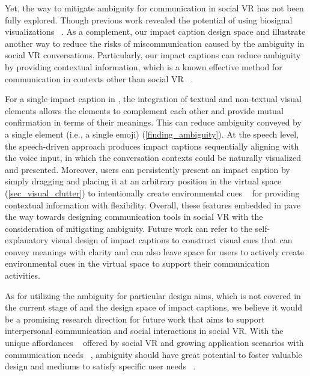 Yet, the way to mitigate ambiguity for communication in social VR has not been fully explored. Though previous work revealed the potential of using biosignal visualizations ~\cite{lee2022understanding}.
As a complement, our impact caption design space and \system{} illustrate another way to reduce the risks of miscommunication caused by the ambiguity in social VR conversations. Particularly, our impact captions can reduce ambiguity by providing contextual information, which is a known effective method for communication in contexts other than social VR ~\cite{cottone2009solving, dey2005designing, miller2017understanding}.

For a single impact caption in \system{}, the integration of textual and non-textual visual elements allows the elements to complement each other and provide mutual confirmation in terms of their meanings. This can reduce ambiguity conveyed by a single element (i.e., a single emoji) (\autoref{finding_ambiguity}). 
At the speech level, the speech-driven approach produces impact captions sequentially aligning with the voice input, in which the conversation contexts could be naturally visualized and presented. 
Moreover, users can persistently present an impact caption by simply dragging and placing it at an arbitrary position in the virtual space (\autoref{sec_visual_clutter}) to intentionally create environmental cues ~\cite{cottone2009solving} for providing contextual information with flexibility.
Overall, these features embedded in \system{} pave the way towards designing communication tools in social VR with the consideration of mitigating ambiguity. 
Future work can refer to the self-explanatory visual design of impact captions to construct visual cues that can convey meanings with clarity and can also leave space for users to actively create environmental cues in the virtual space to support their communication activities.

As for utilizing the ambiguity for particular design aims, which is not covered in the current stage of \system{} and the design space of impact captions, we believe it would be a promising research direction for future work that aims to support interpersonal communication and social interactions in social VR.
With the unique affordances ~\cite{mcveigh2022beyond, freeman2021body, freeman2021hugging, wei2022communication} offered by social VR and growing application scenarios with communication needs ~\cite{maloney2020falling, chen2024drink, mei2021cakevr}, ambiguity should have great potential to foster valuable design and mediums to satisfy specific user needs ~\cite{stacey2003against, gaver2003ambiguity}.



